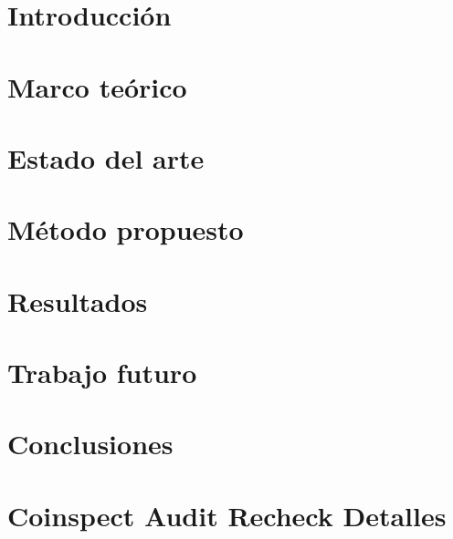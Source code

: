 \documentclass[a4paper, twoside]{report}
\begin{document}



 
 
 
\tableofcontents


\chapter{Introducción}
\label{chap:introduccion}


\chapter{Marco teórico}
\label{chap:marco}


\chapter{Estado del arte}
\label{chap:estado}


\chapter{Método propuesto}
\label{chap:metodo}


\chapter{Resultados}
\label{chap:resultados}


\chapter{Trabajo futuro}
\label{chap:trabajo}


\chapter{Conclusiones}
\label{chap:conclusiones}


\appendix
\chapter{Coinspect Audit Recheck Detalles}
\label{chap:appendixA}


\printbibheading
\printbibliography[nottype=online, heading=subbibliography, title={Libros y publicaciones}]
\printbibliography[type=online, heading=subbibliography, title={Otros recursos}]
\end{document}
